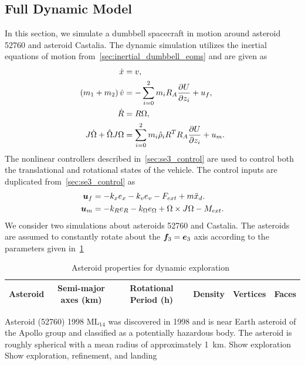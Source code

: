 \subsection{Full Dynamic Model }\label{sec:dynamic_exploration}
In this section, we simulate a dumbbell spacecraft in motion around asteroid \num{52760} and asteroid Castalia.
The dynamic simulation utilizes the inertial equations of motion from~\cref{sec:inertial_dumbbell_eoms} and are given as
\begin{align*}
    \dot{x} &= v, \\
    \left( m_1 + m_2 \right) \dot{v} &= - \sum_{i=0}^2 m_i R_A \frac{\partial U}{\partial z_i} + u_f, \\
    \dot{R} &= R \Omega, \label{eq:inertial_attitude_dynamics}\\
    J \dot{\Omega} + \hat{\Omega} J \Omega &= \sum_{i=0}^2 m_i \hat{\rho}_i R^T R_A \frac{\partial U}{\partial z_i} + u_m. 
\end{align*}
The nonlinear controllers described in~\cref{sec:se3_control} are used to control both the translational and rotational states of the vehicle.
The control inputs are duplicated from~\cref{sec:se3_control} as
\begin{align*}
    \bm{u}_f &= -k_x e_x - k_v e_v - F_{ext} + m \ddot{x}_d . \\
    \bm{u}_m &= -k_R e_R - k_\Omega e_\Omega + \Omega \times J \Omega - M_{ext}.
\end{align*}
We consider two simulations about asteroids \num{52760} and Castalia.
The asteroids are assumed to constantly rotate about the \( \bm{f}_3 = \bm{e}_3\) axis according to the parameters given in~\cref{tab:dynamic_asteroids}
\begin{table}[htbp]
    \centering
    \begin{tabular}{lccccc}
        \toprule
        Asteroid & Semi-major axes (\si{\kilo\meter}) & Rotational Period (\si{\hour}) & Density & Vertices & Faces\\
        \midrule
        \bottomrule
    \end{tabular} 
    \caption{Asteroid properties for dynamic exploration~\label{tab:dynamic_asteroids}}
\end{table}

Asteroid (\num{52760}) \num{1998} \(\text{ML}_{14}\) was discovered in \num{1998} and is near Earth asteroid of the Apollo group and classified as a potentially hazardous body.
The asteroid is roughly spherical with a mean radius of approximately \SI{1}{\kilo\meter}.
Show exploration
Show exploration, refinement, and landing


